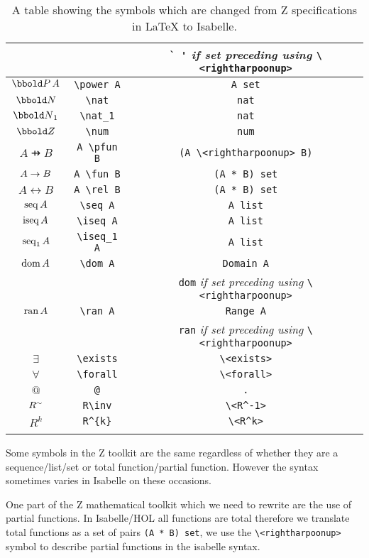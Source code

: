 {\begin{longtable}[H]{|c | c | c |}
& & \verb|` '| \textit{if set preceding using} \verb|\<rightharpoonup>| \\
\hline
$\power A$ & \verb|\power A| & \verb|A set| \\
\hline
$\nat$ & \verb|\nat| & \verb|nat| \\
\hline
$\nat_1$ & \verb|\nat_1| & \verb|nat| \\
\hline
$\num$ & \verb|\num| & \verb|num| \\
\hline
$A \pfun B$ & \verb|A \pfun B| & \verb|(A \<rightharpoonup> B)| \\
\hline
$A \rightarrow B$ & \verb|A \fun B| & \verb|(A * B) set| \\
\hline
$A \rel B$ & \verb|A \rel B| & \verb|(A * B) set| \\
\hline
$\mathop{\mathrm{seq}} A$ & \verb|\seq A| & \verb|A list| \\
\hline
$\mathop{\mathrm{iseq}} A$ & \verb|\iseq A| & \verb|A list| \\
\hline
$\mathop{\mathrm{seq}}_1 A$ & \verb|\iseq_1 A| & \verb|A list| \\
\hline
$\mathop{\mathrm{dom}} A$ & \verb|\dom A| & \verb|Domain A| \\
& & \verb|dom| \textit{if set preceding using} \verb|\<rightharpoonup>| \\
\hline
$\mathop{\mathrm{ran}} A$ & \verb|\ran A| & \verb|Range A| \\
& & \verb|ran| \textit{if set preceding using} \verb|\<rightharpoonup>| \\
\hline
$\exists$ & \verb|\exists| & \verb|\<exists>| \\
\hline
$\forall$ & \verb|\forall| & \verb|\<forall>| \\
\hline
$@$ & \verb|@| & \verb|.| \\
\hline
$R^\sim$ & \verb|R\inv| & \verb|\<R^-1>| \\
\hline
$R^{k}$ & \verb|R^{k}| & \verb|\<R^k>| \\
\hline
\caption{A table showing the symbols which are changed from Z specifications in \LaTeX{} to Isabelle.}
\label{tab:latextoisabelle}
\end{longtable}
}

Some symbols in the Z toolkit are the same regardless of whether they are a
sequence/list/set or total function/partial function. However the syntax
sometimes varies in Isabelle on these occasions.

One part of the Z mathematical toolkit which we need to rewrite are the use of
partial functions. In Isabelle/HOL all functions are total therefore 
we translate total functions as a set of pairs \verb|(A * B) set|, we use the
\verb|\<rightharpoonup>| symbol to describe partial functions in the isabelle syntax. 

